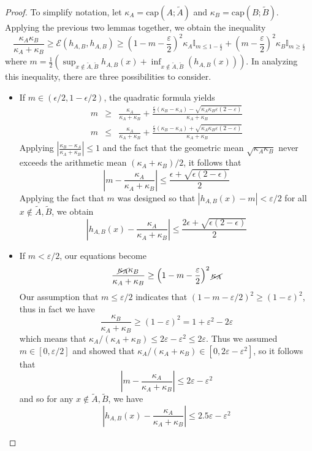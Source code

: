 \documentclass[english, aip, jcp, priprint, graphicx,floatfix]{revtex4-1}
\theoremstyle{plain}
\theoremstyle{definition}
\theoremstyle{plain}
\newcommand{\indicatorf}[1]{\mathbb{I}_{#1}}
\newcommand{\capac}[2]{\mathrm{cap}\left(#1;#2\right)}
\begin{document}
\begin{proof}
\newcommand{\capA}{\kappa_A}
\newcommand{\capB}{\kappa_B}

To simplify notation, let $\capA=\capac{A}{\tilde A}$ and $\capB=\capac{B}{\tilde B}$.  Applying the previous two lemmas together, we obtain the inequality
\[
\frac{\capA \capB}{\capA +\capB}
\geq \mathscr{E}(h_{A,B},h_{A,B}) \geq
\left( 1 - m - \frac{\varepsilon}{2} \right)^2 \capA \indicatorf{m\leq 1-\frac{\varepsilon}{2}} + 
   \left( m- \frac{\varepsilon}{2} \right)^2 \capB \indicatorf{m\geq \frac{\varepsilon}{2}} 
\]
where $m = \frac{1}{2} (\sup_{x \notin \tilde A,\tilde B} h_{A,B} (x) + \inf_{x \notin \tilde A,\tilde B} (h_{A,B} (x)))$.  In analyzing this inequality, there are three possibilities to consider.  
\begin{itemize}
    \item If $m \in (\epsilon/2,1-\epsilon/2)$, the quadratic formula yields
    \begin{eqnarray*}
    m & \geqslant & \frac{\capA}{\capA + \capB} + \frac{
    \frac{\varepsilon}{2}(\capB - \capA) - 
    \sqrt{\capA \capB \varepsilon( 2 - \varepsilon)}}{\capA+\capB}\\
    m & \leqslant & \frac{\capA}{\capA + \capB} + \frac{
    \frac{\varepsilon}{2}(\capB - \capA) +
    \sqrt{\capA \capB \varepsilon( 2 - \varepsilon)}}{\capA+\capB}
    \end{eqnarray*}
    Applying $\left|\frac{\capB - \capA}{\capA + \capB}\right| \leq 1$ and the fact that the geometric mean $\sqrt{\capA \capB}$ never exceeds the arithmetic mean $(\capA+\capB) / 2$, it follows that
    \[
    \left|m -  \frac{\capA}{\capA + \capB}\right| \leq \frac{\epsilon +\sqrt{\epsilon (2-\epsilon)}}{2}
    \]
    Applying the fact that $m$ was designed so that $|h_{A,B}(x) - m| <\varepsilon/2$ for all $x \notin \tilde A,\tilde B$, we obtain
    \[
    \left|h_{A,B}(x) -  \frac{\capA}{\capA + \capB}\right| \leq \frac{2\epsilon +\sqrt{\epsilon (2-\epsilon)}}{2}
    \]

    \item If $m<\varepsilon/2$, our equations become 
    \[
    \frac{\cancel{\capA} \capB}{\capA +\capB}
    \geq
    \left( 1-m- \frac{\varepsilon}{2} \right)^2 \cancel{\capA} 
    \]
    Our assumption that $m \leq \varepsilon/2$ indicates that $(1- m- \varepsilon/2)^2 \geq (1-\varepsilon)^2$, thus in fact we have 
    \[
    \frac{\capB}{\capA +\capB}
    \geq
    \left( 1- \varepsilon \right)^2  = 1 + \varepsilon^2 - 2\varepsilon
    \]
    which means that $\capA/(\capA +\capB)
    \leq
    2\varepsilon - \varepsilon^2 \leq 2\varepsilon$.  
    Thus we assumed $m\in[0,\varepsilon/2]$ and showed that $\capA/(\capA+\capB)\in[0,2\varepsilon-\varepsilon^2]$, so it follows that 
    \[
    \left|m -  \frac{\capA}{\capA + \capB}\right| \leq 2\varepsilon -\varepsilon^2
    \]
    and so for any $x\notin \tilde A,\tilde B$, we have 
    \[
    \left|h_{A,B}(x) -  \frac{\capA}{\capA + \capB}\right| \leq 2.5\varepsilon -\varepsilon^2
    \]
    

\end{itemize}
\end{proof}
\end{document}
